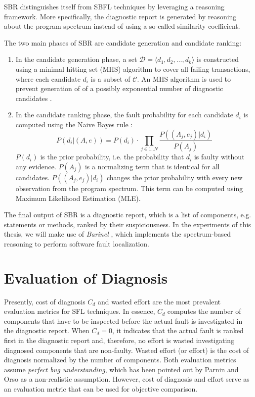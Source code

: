 \documentclass[twoside,a4paper,11pt]{memoir}
\begin{document}
SBR distinguishes itself from SBFL techniques by leveraging a reasoning framework.
More specifically, the diagnostic report is generated by reasoning about the program spectrum instead of using a so-called similarity coefficient.

The two main phases of SBR are candidate generation and candidate ranking:
\begin{enumerate}
  \item In the candidate generation phase, a set $\mathcal{D} = \langle d_1, d_2, \dots, d_k \rangle$ is constructed using a minimal hitting set (MHS) algorithm to cover all failing transactions, where each candidate $d_i$ is a subset of $\mathcal{C}$.
  An MHS algorithm is used to prevent generation of of a possibly exponential number of diagnostic candidates \cite{Abreu:2009:SMF:1747491.1747511}.

  \item In the candidate ranking phase, the fault probability for each candidate $d_i$ is computed using the Naive Bayes rule \cite{Abreu:2009:SMF:1747491.1747511}:
  \begin{equation}
    P(d_i | (A, e)) = P(d_i) \cdot \prod_{j \in 1..N} \frac{P((A_j, e_j) | d_i)}{P(A_j)}
  \end{equation}
  $P(d_i)$ is the prior probability, i.e. the probability that $d_i$ is faulty without any evidence.
  $P(A_j)$ is a normalizing term that is identical for all candidates.
  $P((A_j, e_j) | d_i)$ changes the prior probability with every new observation from the program spectrum.
  This term can be computed using Maximum Likelihood Estimation (MLE).
\end{enumerate}

The final output of SBR is a diagnostic report, which is a list of components, e.g. statements or methods, ranked by their suspiciousness.
In the experiments of this thesis, we will make use of \emph{Barinel} \cite{Abreu:2009:SMF:1747491.1747511}, which implements the spectrum-based reasoning to perform software fault localization.

\section{Evaluation of Diagnosis}
Presently, cost of diagnosis $C_d$ and wasted effort are the most prevalent evaluation metrics for SFL techniques.
In essence, $C_d$ computes the number of components that have to be inspected before the actual fault is investigated in the diagnostic report.
When $C_d = 0$, it indicates that the actual fault is ranked first in the diagnostic report and, therefore, no effort is wasted investigating diagnosed components that are non-faulty.
Wasted effort (or effort) is the cost of diagnosis normalized by the number of components.
Both evaluation metrics assume \emph{perfect bug understanding}, which has been pointed out by Parnin and Orso \cite{Parnin:2011:ADT:2001420.2001445} as a non-realistic assumption.
However, cost of diagnosis and effort serve as an evaluation metric that can be used for objective comparison.
\end{document}
